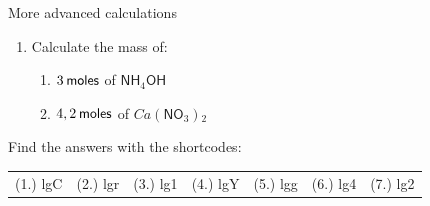 \begin{exercises}{  More advanced calculations
      }
\begin{enumerate}[noitemsep, label=\textbf{\arabic*}. ]
\begin{enumerate}[noitemsep, label=\textbf{\alph*}. ]
\end{enumerate}
                \label{m38717*uid61}\item Calculate the mass of:
\label{m38717*id280072}\begin{enumerate}[noitemsep, label=\textbf{\alph*}. ] 
            \label{m38717*uid62}\item $3\phantom{\rule{2pt}{0ex}}\mathsf{moles}$ of $\mathsf{NH}{}_{4}\mathsf{OH}$
\label{m38717*uid63}\item $4,2\phantom{\rule{2pt}{0ex}}\mathsf{moles}$ of $Ca\left(\mathsf{NO}{}_{3}\right){}_{2}$\end{enumerate}

\end{enumerate}
  \label{m38717**end}
\par {} Find the answers with the shortcodes:
 \par \begin{tabular}[h]{cccccc}
 (1.) lgC  &  (2.) lgr  &  (3.) lg1  &  (4.) lgY  &  (5.) lgg  &  (6.) lg4  &  (7.) lg2  & \end{tabular}
\end{exercises}
